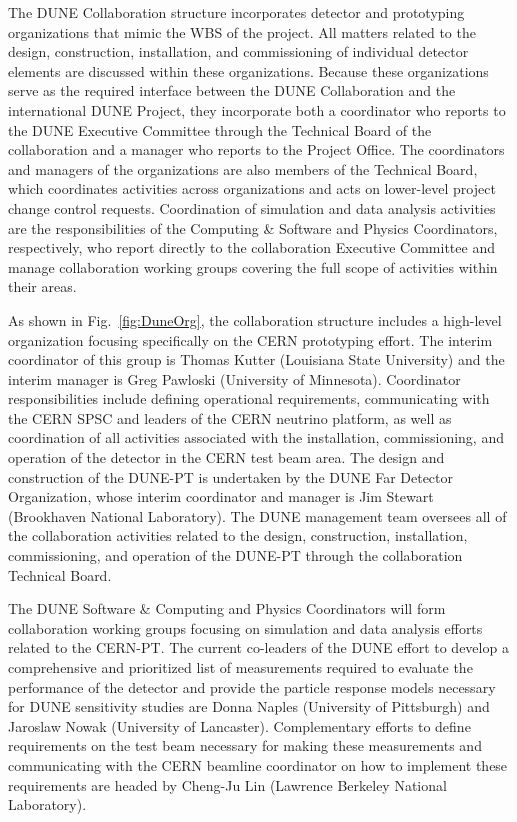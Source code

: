 The DUNE Collaboration structure incorporates detector and prototyping organizations that mimic the WBS of the project.  
All matters related to the design, construction, installation, and commissioning of individual detector elements are discussed 
within these organizations.  Because these organizations serve as the required interface between the DUNE Collaboration and the 
international DUNE Project, they incorporate both a coordinator who reports to the DUNE Executive Committee through the Technical
Board of the collaboration and a manager who reports to the Project Office.  The coordinators and managers of the organizations  
are also members of the Technical Board, which coordinates activities across organizations and acts on lower-level project change 
control requests.  Coordination of simulation and data analysis activities are the responsibilities of the Computing \& Software 
and Physics Coordinators, respectively, who report directly to the collaboration Executive Committee and manage collaboration 
working groups covering the full scope of activities within their areas.     

As shown in Fig.~\ref{fig:DuneOrg}, the collaboration structure includes a high-level organization focusing specifically on the 
CERN prototyping effort.  The interim coordinator of this group is Thomas Kutter (Louisiana State University) and the interim 
manager is Greg Pawloski (University of Minnesota).  Coordinator responsibilities include defining operational requirements, 
communicating with the CERN SPSC and leaders of the CERN neutrino platform, as well as coordination of all activities associated 
with the installation, commissioning, and operation of the detector in the CERN test beam area.  The design and construction of 
the DUNE-PT is undertaken by the DUNE Far Detector Organization, whose interim coordinator and manager is Jim Stewart (Brookhaven 
National Laboratory).  The DUNE management team oversees all of the collaboration activities related to the design, construction, 
installation, commissioning, and operation of the DUNE-PT through the collaboration Technical Board.

The DUNE Software \& Computing and Physics Coordinators will form collaboration working groups focusing on simulation and data 
analysis efforts related to the CERN-PT.  The current co-leaders of the DUNE effort to develop a comprehensive and prioritized 
list of measurements required to evaluate the performance of the detector and provide the particle response models necessary for 
DUNE sensitivity studies are Donna Naples (University of Pittsburgh) and Jaroslaw Nowak (University of Lancaster).  Complementary 
efforts to define requirements on the test beam necessary for making these measurements and communicating with the CERN beamline 
coordinator on how to implement these requirements are headed by Cheng-Ju Lin (Lawrence Berkeley National Laboratory).  

